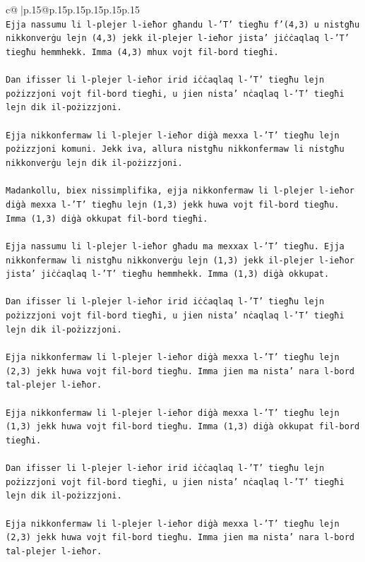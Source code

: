 \documentclass{article}
\begin{document}
{\begin{supertabular}{c@{$\;$}|p{.15\linewidth}@{}p{.15\linewidth}p{.15\linewidth}p{.15\linewidth}p{.15\linewidth}p{.15\linewidth}}
{{{\\ 
\texttt{Ejja nassumu li l{-}plejer l{-}ieħor għandu l{-}'T' tiegħu f'(4,3) u nistgħu nikkonverġu lejn (4,3) jekk il{-}plejer l{-}ieħor jista' jiċċaqlaq l{-}'T' tiegħu hemmhekk. Imma (4,3) mhux vojt fil{-}bord tiegħi.} \\
\\ 
\texttt{Dan ifisser li l{-}plejer l{-}ieħor irid iċċaqlaq l{-}'T' tiegħu lejn pożizzjoni vojt fil{-}bord tiegħi, u jien nista' nċaqlaq l{-}'T' tiegħi lejn dik il{-}pożizzjoni.} \\
\\ 
\texttt{Ejja nikkonfermaw li l{-}plejer l{-}ieħor diġà mexxa l{-}'T' tiegħu lejn pożizzjoni komuni. Jekk iva, allura nistgħu nikkonfermaw li nistgħu nikkonverġu lejn dik il{-}pożizzjoni.} \\
\\ 
\texttt{Madankollu, biex nissimplifika, ejja nikkonfermaw li l{-}plejer l{-}ieħor diġà mexxa l{-}'T' tiegħu lejn (1,3) jekk huwa vojt fil{-}bord tiegħu. Imma (1,3) diġà okkupat fil{-}bord tiegħi.} \\
\\ 
\texttt{Ejja nassumu li l{-}plejer l{-}ieħor għadu ma mexxax l{-}'T' tiegħu. Ejja nikkonfermaw li nistgħu nikkonverġu lejn (1,3) jekk il{-}plejer l{-}ieħor jista' jiċċaqlaq l{-}'T' tiegħu hemmhekk. Imma (1,3) diġà okkupat.} \\
\\ 
\texttt{Dan ifisser li l{-}plejer l{-}ieħor irid iċċaqlaq l{-}'T' tiegħu lejn pożizzjoni vojt fil{-}bord tiegħi, u jien nista' nċaqlaq l{-}'T' tiegħi lejn dik il{-}pożizzjoni.} \\
\\ 
\texttt{Ejja nikkonfermaw li l{-}plejer l{-}ieħor diġà mexxa l{-}'T' tiegħu lejn (2,3) jekk huwa vojt fil{-}bord tiegħu. Imma jien ma nista' nara l{-}bord tal{-}plejer l{-}ieħor.} \\
\\ 
\texttt{Ejja nikkonfermaw li l{-}plejer l{-}ieħor diġà mexxa l{-}'T' tiegħu lejn (1,3) jekk huwa vojt fil{-}bord tiegħu. Imma (1,3) diġà okkupat fil{-}bord tiegħi.} \\
\\ 
\texttt{Dan ifisser li l{-}plejer l{-}ieħor irid iċċaqlaq l{-}'T' tiegħu lejn pożizzjoni vojt fil{-}bord tiegħi, u jien nista' nċaqlaq l{-}'T' tiegħi lejn dik il{-}pożizzjoni.} \\
\\ 
\texttt{Ejja nikkonfermaw li l{-}plejer l{-}ieħor diġà mexxa l{-}'T' tiegħu lejn (2,3) jekk huwa vojt fil{-}bord tiegħu. Imma jien ma nista' nara l{-}bord tal{-}plejer l{-}ieħor.} \\
}}}
\end{supertabular}}
\end{document}
